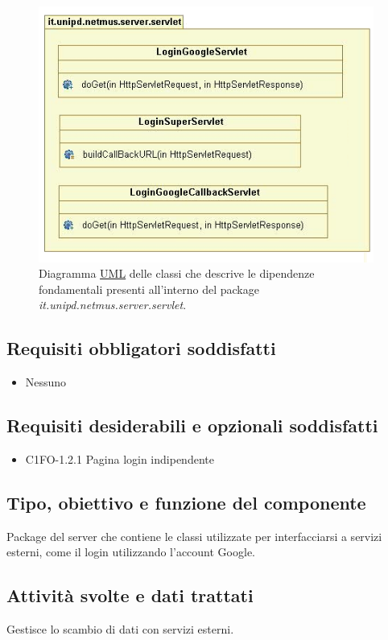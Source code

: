 \begin{figure}[!h]
  \centering
  \includegraphics[width=11cm]{img/DP/classes_servlet.png}
\caption{Diagramma \underline{UML} delle classi che descrive le dipendenze
fondamentali presenti all'interno del package
\emph{it.unipd.netmus.server.servlet}.}
\end{figure}

\subsection*{Requisiti obbligatori soddisfatti}
\begin{itemize}
	\item Nessuno
\end{itemize}
\subsection*{Requisiti desiderabili e opzionali soddisfatti}
\begin{itemize}
    \item C1FO-1.2.1 Pagina login indipendente
\end{itemize}
\subsection*{Tipo, obiettivo e funzione del componente}
Package del server che contiene le classi utilizzate per interfacciarsi a
servizi esterni, come il login utilizzando l'account Google.
\subsection*{Attivit\`a svolte e dati trattati}
Gestisce lo scambio di dati con servizi esterni.


